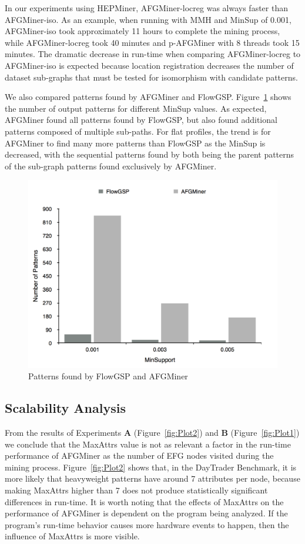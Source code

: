 In our experiments using HEPMiner, AFGMiner-locreg was always faster than AFGMiner-iso. As an example, when running with MMH and MinSup of 0.001, AFGMiner-iso took approximately 11 hours to complete the mining process, while AFGMiner-locreg took 40 minutes and p-AFGMiner with 8 threads took 15 minutes. The dramatic decrease in run-time when comparing AFGMiner-locreg to AFGMiner-iso is expected because location registration decreases the number of dataset sub-graphs that must be tested for isomorphism with candidate patterns. 

We also compared patterns found by AFGMiner and FlowGSP. Figure~\ref{fig:NumPatterns} shows the number of output patterns for different MinSup values. As expected, AFGMiner found all patterns found by FlowGSP, but also found additional patterns composed of multiple sub-paths. For flat profiles, the trend is for AFGMiner to find many more patterns than FlowGSP as the MinSup is decreased, with the sequential patterns found by both being the parent patterns of the sub-graph patterns found exclusively by AFGMiner. 

\begin{figure}[h!]
\centering
    \includegraphics[scale=0.18]{figures/numPatternsComp.pdf}
    \caption{Patterns found by FlowGSP and AFGMiner}
    \label{fig:NumPatterns}
\end{figure}

\subsection{Scalability Analysis}
\label{subsec:Scalability}
From the results of Experiments {\bf A} (Figure~\ref{fig:Plot2}) and {\bf B} (Figure~\ref{fig:Plot1}) we conclude that the MaxAttrs value is not as relevant a factor in the run-time performance of AFGMiner as the number of EFG nodes visited during the mining process. Figure~\ref{fig:Plot2} shows that, in the DayTrader Benchmark, it is more likely that heavyweight patterns have around 7 attributes per node, because making MaxAttrs higher than 7 does not produce statistically significant differences in run-time. It is worth noting that the effects of MaxAttrs on the performance of AFGMiner is dependent on the program being analyzed. If the program's run-time behavior causes more hardware events to happen, then the influence of MaxAttrs is more visible.


